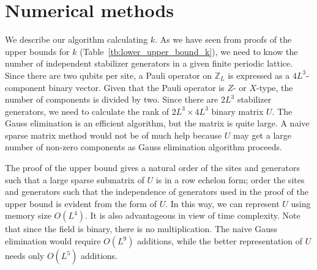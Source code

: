 \documentclass[letterpaper,10pt,pra,aps,showpacs,twocolumn]{revtex4-1}
\theoremstyle{definition} \newtheorem{defn}{Definition}
\theoremstyle{definition} \newtheorem{remark}{Remark}
\begin{document}
\section{Numerical methods}
\label{section:numerical_methods}

We describe our algorithm calculating $k$. As we have seen from proofs of the upper bounds for $k$ (Table~\ref{tb:lower_upper_bound_k}), we need to know the number of independent stabilizer generators in a given finite periodic lattice. Since there are two qubits per site, a Pauli operator on $\mathbb{Z}_L$ is expressed as a $4L^3$-component binary vector. Given that the Pauli operator is $Z$- or $X$-type, the number of components is divided by two. Since there are $2L^3$ stabilizer generators, we need to calculate the rank of $2 L^3 \times 4 L^3$ binary matrix $U$. The Gauss elimination is an efficient algorithm, but the matrix is quite large. A naive sparse matrix method would not be of much help because $U$ may get a large number of non-zero components as Gauss elimination algorithm proceeds.

The proof of the upper bound gives a natural order of the sites and generators such that a large sparse submatrix of $U$ is in a row echelon form; order the sites and generators such that the independence of generators used in the proof of the upper bound is evident from the form of $U$. In this way, we can represent $U$ using memory size $O(L^4)$. It is also advantageous in view of time complexity. Note that since the field is binary, there is no multiplication. The naive Gauss elimination would require $O(L^9)$ additions, while the better representation of $U$ needs only $O(L^5)$ additions.
\end{document}
